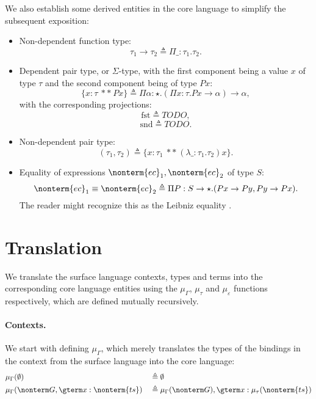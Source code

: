 \documentclass[a4paper]{article}
\begin{document}
We also establish some derived entities in the core language to simplify the subsequent exposition:

\begin{itemize}
  \item Non-dependent function type:
    \[
      \tau_1 \rightarrow \tau_2 \triangleq \Pi \_ : \tau_1. \tau_2.
    \]
  \item Dependent pair type, or $\Sigma$-type, with the first component being a value $x$ of type $\tau$ and the second component being of type $P x$:
    \[
      \{ x : \tau\ **\ P x \} \triangleq \Pi \alpha : \star. (\Pi x : \tau. P x \rightarrow \alpha) \rightarrow \alpha,
    \]
    with the corresponding projections:
    \[
      \text{fst} \triangleq TODO,
    \]
    \[
      \text{snd} \triangleq TODO.
    \]
  \item Non-dependent pair type:
    \[
      (\tau_1, \tau_2) \triangleq \{ x : \tau_1\ **\ (\lambda \_ : \tau_1. \tau_2) x \}.
    \]
  \item Equality of expressions $\nonterm{ec}_1, \nonterm{ec}_2$ of type $S$:
    \[
      \nonterm{ec}_1 \equiv \nonterm{ec}_2 \triangleq \Pi P : S \rightarrow \star. (P x \rightarrow P y, P y \rightarrow P x).
    \]
    The reader might recognize this as the Leibniz equality \cite{FindSomethingForThis}.
\end{itemize}

\section{Translation}

\newcommand{\tranctx}{\mu_\Gamma}
\newcommand{\tranty}{\mu_\tau}
\newcommand{\tranterm}{\mu_\varepsilon}

We translate the surface language contexts, types and terms into the corresponding core language entities
using the $\mu_\Gamma$, $\mu_\tau$ and $\mu_\varepsilon$ functions respectively,
which are defined mutually recursively.

\paragraph{Contexts.}
We start with defining $\tranctx$,
which merely translates the types of the bindings in the context from the surface language into the core language:
\begin{equation}
\begin{aligned}
  & \tranctx(\emptyset)                                       && \triangleq \emptyset                                               \\
  & \tranctx(\nonterm G, \gterm x : \nonterm{ts})             && \triangleq \tranctx(\nonterm G), \gterm x : \tranty(\nonterm{ts})  \\
\end{aligned}
\end{equation}
\end{document}

